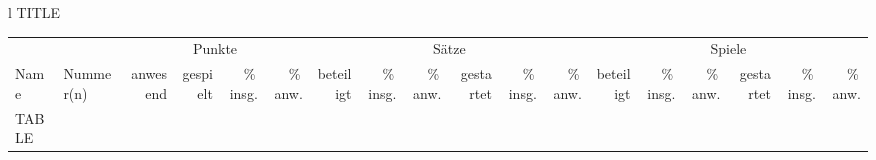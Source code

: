 \documentclass{standalone}
\newcommand\myhline{\cmidrule(r){1-2}\cmidrule(lr){3-6}\cmidrule(lr){7-12}\cmidrule(l){13-18}}
\begin{document}
   \begin{tabular}{l}
   TITLE\\
      \begin{tabular}{ ll r rrr rrr rrr rrr rrr}
\toprule
         && \multicolumn{4}{c}{Punkte} & \multicolumn{6}{c}{Sätze} & \multicolumn{6}{c}{Spiele}\\%
         Name & Nummer(n) & anwesend & gespielt & \%\,insg. & \%\,anw. & beteiligt & \%\,insg. & \%\,anw. & gestartet & \%\,insg. & \%\,anw. & beteiligt & \%\,insg. & \%\,anw. & gestartet & \%\,insg. & \%\,anw. \\\myhline
      TABLE
      \bottomrule
      \end{tabular}
   \end{tabular}
\end{document}
